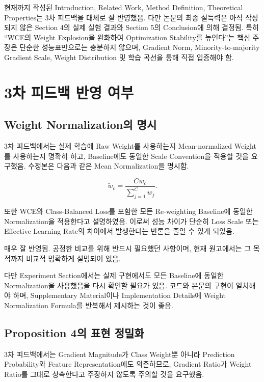 \documentclass[11pt,a4paper]{article}
\begin{document}
\begin{tcolorbox}[title=종합 판단]
현재까지 작성된 Introduction, Related Work, Method Definition, Theoretical Properties는 3차 피드백을 대체로 잘 반영했음. 다만 논문의 최종 설득력은 아직 작성되지 않은 Section 4의 실제 실험 결과와 Section 5의 Conclusion에 의해 결정됨. 특히 ``WCE의 Weight Explosion을 완화하여 Optimization Stability를 높인다''는 핵심 주장은 단순한 성능표만으로는 충분하지 않으며, Gradient Norm, Minority-to-majority Gradient Scale, Weight Distribution 및 학습 곡선을 통해 직접 입증해야 함.
\end{tcolorbox}

\section{3차 피드백 반영 여부}

\subsection{Weight Normalization의 명시}

3차 피드백에서는 실제 학습에 Raw Weight를 사용하는지 Mean-normalized Weight를 사용하는지 명확히 하고, Baseline에도 동일한 Scale Convention을 적용할 것을 요구했음. 수정본은 다음과 같은 Mean Normalization을 명시함.

\[
\widetilde{w}_c
=
\frac{Cw_c}{\sum_{j=1}^{C}w_j}.
\]

또한 WCE와 Class-Balanced Loss를 포함한 모든 Re-weighting Baseline에 동일한 Normalization을 적용한다고 설명하였음. 이로써 성능 차이가 단순히 Loss Scale 또는 Effective Learning Rate의 차이에서 발생한다는 반론을 줄일 수 있게 되었음.

\begin{tcolorbox}[title=반영 평가]
매우 잘 반영됨. 공정한 비교를 위해 반드시 필요했던 사항이며, 현재 원고에서는 그 목적까지 비교적 명확하게 설명되어 있음.
\end{tcolorbox}

다만 Experiment Section에서는 실제 구현에서도 모든 Baseline에 동일한 Normalization을 사용했음을 다시 확인할 필요가 있음. 코드와 본문의 구현이 일치해야 하며, Supplementary Material이나 Implementation Details에 Weight Normalization Formula를 반복해서 제시하는 것이 좋음.

\subsection{Proposition 4의 표현 정밀화}

3차 피드백에서는 Gradient Magnitude가 Class Weight뿐 아니라 Prediction Probability와 Feature Representation에도 의존하므로, Gradient Ratio가 Weight Ratio를 그대로 상속한다고 주장하지 않도록 주의할 것을 요구했음.
\end{document}
